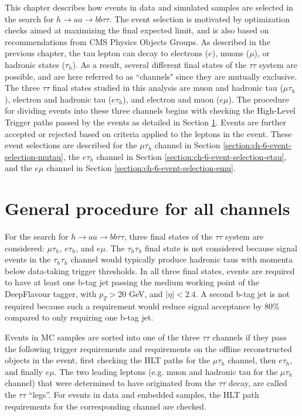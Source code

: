 This chapter describes how events in data and simulated samples are selected in the search for $h \rightarrow aa \rightarrow bb\tau\tau$. The event selection is motivated by optimization checks aimed at maximizing the final expected limit, and is also based on recommendations from CMS Physics Objects Groups. As described in the previous chapter, the tau lepton can decay to electrons ($e$), muons ($\mu$), or hadronic states ($\tau_{h}$). As a result, several different final states of the $\tau\tau$ system are possible, and are here referred to as ``channels" since they are mutually exclusive. The three $\tau\tau$ final states studied in this analysis are muon and hadronic tau ($\mu\tau_{h}$), electron and hadronic tau ($e\tau_{h}$), and electron and muon ($e\mu$). The procedure for dividing events into these three channels begins with checking the High-Level Trigger paths passed by the events as detailed in Section \ref{section:general_event_selection}. Events are further accepted or rejected based on criteria applied to the leptons in the event. These event selections are described for the $\mu\tau_{h}$ channel in Section \ref{section:ch-6-event-selection-mutau}, the $e\tau_{h}$ channel in Section \ref{section:ch-6-event-selection-etau}, and the $e\mu$ channel in Section \ref{section:ch-6-event-selection-emu}.


\section{General procedure for all channels}
\label{section:general_event_selection}
For the search for $h \rightarrow aa \rightarrow bb\tau\tau$, three final states of the $\tau\tau$ system are considered: $\mu\tau_{h}$, $e\tau_{h}$, and $e\mu$. The $\tau_{h}\tau_{h}$ final state is not considered because signal events in the $\tau_{h}\tau_{h}$ channel would typically produce hadronic taus with momenta below data-taking trigger thresholds. In all three final states, events are required to have at least one b-tag jet passing the medium working point of the DeepFlavour tagger, with $p_{T} > 20$ GeV, and $|\eta| < 2.4$. A second b-tag jet is not required because such a requirement would reduce signal acceptance by 80\% compared to only requiring one b-tag jet.

Events in MC samples are sorted into one of the three $\tau\tau$ channels if they pass the following trigger requirements and requirements on the offline reconstructed objects in the event, first checking the HLT paths for the $\mu\tau_{h}$ channel, then $e\tau_{h}$, and finally $e\mu$. The two leading leptons (e.g. muon and hadronic tau for the $\mu\tau_{h}$ channel) that were determined to have originated from the $\tau\tau$ decay, are called the $\tau\tau$ ``legs''. For events in data and embedded samples, the HLT path requirements for the corresponding channel are checked.

